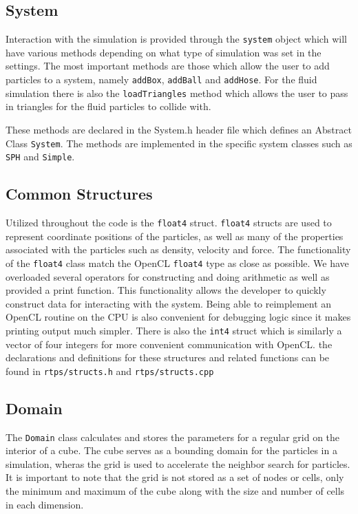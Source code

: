 \subsection{System}

Interaction with the simulation is provided through the \verb|system| object which
will have various methods depending on what type of simulation was set in the
settings. The most important methods are those which allow the user to add
particles to a system, namely \verb|addBox|, \verb|addBall| and \verb|addHose|. For the fluid
simulation there is also the \verb|loadTriangles| method which allows the user to
pass in triangles for the fluid particles to collide with.

These methods are declared in the System.h header file which defines an
Abstract Class \verb|System|. The methods are implemented in the specific system
classes such as \verb|SPH| and \verb|Simple|.

\subsection{Common Structures}

Utilized throughout the code is the \verb|float4| struct. \verb|float4| structs are used
to represent coordinate positions of the particles, as well as many of the
properties associated with the particles such as density, velocity and force.
The functionality of the \verb|float4| class match the OpenCL \verb|float4| type as close
as possible. We have overloaded several operators for constructing and doing
arithmetic as well as provided a print function. This functionality allows the
developer to quickly construct data for interacting with the system. Being able
to reimplement an OpenCL routine on the CPU is also convenient for debugging
logic since it makes printing output much simpler. 
There is also the \verb|int4| struct which is similarly a vector of four integers
for more convenient communication with OpenCL.
the declarations and definitions for these structures and related functions can
be found in \verb|rtps/structs.h| and \verb|rtps/structs.cpp|


\subsection{Domain}

The \verb|Domain| class calculates and stores the parameters for a regular grid
on the interior of a cube. The cube serves as a bounding domain for the
particles in a simulation, wheras the grid is used to accelerate the neighbor
search for particles. It is important to note that the grid is not stored as a
set of nodes or cells, only the minimum and maximum of the cube along with the
size and number of cells in each dimension.

